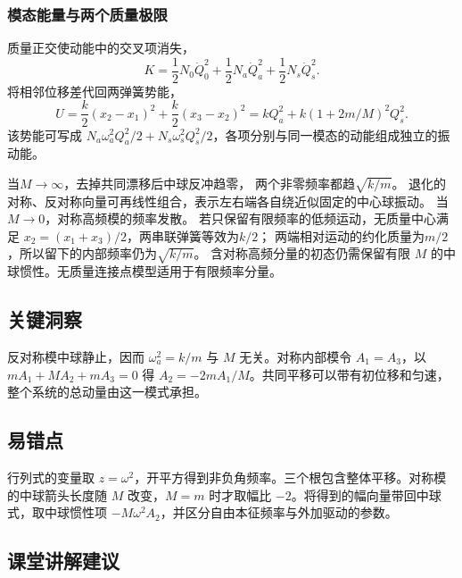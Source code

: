 \documentclass[UTF8,fontset=fandol,a4paper,11pt]{ctexart}
\begin{document}
\subsubsection*{模态能量与两个质量极限}
质量正交使动能中的交叉项消失，
\[
K=\frac12N_0\dot Q_0^2+\frac12N_a\dot Q_a^2+\frac12N_s\dot Q_s^2.
\]
将相邻位移差代回两弹簧势能，
\[
U=\frac k2(x_2-x_1)^2+\frac k2(x_3-x_2)^2
=kQ_a^2+k(1+2m/M)^2Q_s^2.
\]
该势能可写成 $N_a\omega_a^2Q_a^2/2+N_s\omega_s^2Q_s^2/2$，各项分别与同一模态的动能组成独立的振动能。

当$M\to\infty$，去掉共同漂移后中球反冲趋零，
两个非零频率都趋$\sqrt{k/m}$。
退化的对称、反对称向量可再线性组合，表示左右端各自绕近似固定的中心球振动。
当$M\to0$，对称高频模的频率发散。
若只保留有限频率的低频运动，无质量中心满足
$x_2=(x_1+x_3)/2$，两串联弹簧等效为$k/2$；
两端相对运动的约化质量为$m/2$，所以留下的内部频率仍为$\sqrt{k/m}$。
含对称高频分量的初态仍需保留有限 $M$ 的中球惯性。无质量连接点模型适用于有限频率分量。




\subsection*{关键洞察}

反对称模中球静止，因而 $\omega_a^2=k/m$ 与 $M$ 无关。对称内部模令 $A_1=A_3$，以 $mA_1+MA_2+mA_3=0$ 得 $A_2=-2mA_1/M$。共同平移可以带有初位移和匀速，整个系统的总动量由这一模式承担。




\subsection*{易错点}

行列式的变量取 $z=\omega^2$，开平方得到非负角频率。三个根包含整体平移。对称模的中球箭头长度随 $M$ 改变，$M=m$ 时才取幅比 $-2$。将得到的幅向量带回中球式，取中球惯性项 $-M\omega^2 A_2$，并区分自由本征频率与外加驱动的参数。




\subsection*{课堂讲解建议}
\end{document}
